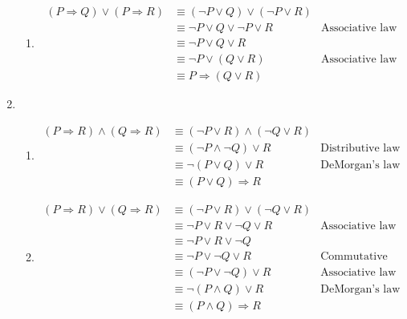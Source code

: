 \documentclass{article}
\begin{document}
\begin{enumerate}
\begin{enumerate}
  \item
    \begin{equation*}
      \begin{aligned}
        (P \Rightarrow Q) \lor (P \Rightarrow R) &\equiv (\lnot P \lor Q) \lor (\lnot P \lor R) \\
        &\equiv \lnot P \lor Q \lor \lnot P \lor R & \text{Associative law} \\
        &\equiv \lnot P \lor Q \lor R \\
        &\equiv \lnot P \lor (Q \lor R) & \text{Associative law} \\
        &\equiv P \Rightarrow (Q \lor R)
      \end{aligned}
    \end{equation*}
  \end{enumerate}
\item
  \begin{enumerate}
  \item
    \begin{equation*}
      \begin{aligned}
        (P \Rightarrow R) \land (Q \Rightarrow R) &\equiv (\lnot P \lor R) \land (\lnot Q \lor R) \\
        &\equiv (\lnot P \land \lnot Q) \lor R & \text{Distributive law} \\
        &\equiv \lnot (P \lor Q) \lor R & \text{DeMorgan's law} \\
        &\equiv (P \lor Q) \Rightarrow R
      \end{aligned}
    \end{equation*}
  \item
     \begin{equation*}
       \begin{aligned}
         (P \Rightarrow R) \lor (Q \Rightarrow R) &\equiv (\lnot P \lor R) \lor (\lnot Q \lor R) \\
         &\equiv \lnot P \lor R \lor \lnot Q \lor R & \text{Associative law} \\
         &\equiv \lnot P \lor R \lor \lnot Q \\
         &\equiv \lnot P \lor \lnot Q \lor R & \text{Commutative law} \\
         &\equiv (\lnot P \lor \lnot Q) \lor R & \text{Associative law} \\
         &\equiv \lnot (P \land Q) \lor R & \text{DeMorgan's law} \\
         &\equiv (P \land Q) \Rightarrow R
       \end{aligned}
    \end{equation*}


\end{enumerate}
\end{enumerate}
\end{document}
